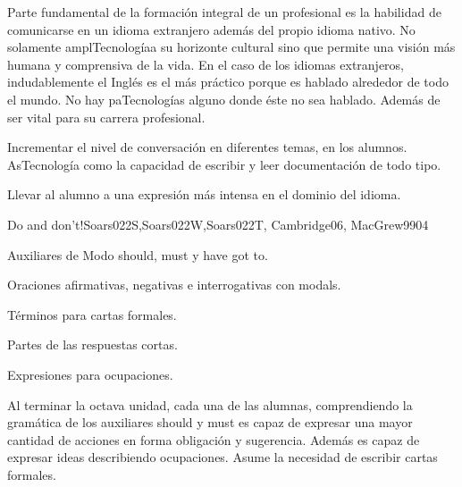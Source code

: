 \begin{syllabus}


\begin{justification}
Parte fundamental de la formación integral de un profesional es la habilidad 
de comunicarse en un idioma extranjero además del propio idioma nativo. 
No solamente amplTecnologíaa su horizonte cultural sino que permite una visión 
más humana y comprensiva de la vida. En el caso de los idiomas extranjeros, 
indudablemente el Inglés es el más práctico porque es hablado alrededor de 
todo el mundo. No hay paTecnologías alguno donde éste no sea hablado. Además de ser 
vital para su carrera profesional.
\end{justification}

\begin{goals}
\item Incrementar el nivel de conversación en diferentes temas, en los alumnos. AsTecnología como la capacidad de escribir y leer documentación de todo tipo.
\item Llevar al alumno a una expresión más intensa en el dominio del idioma.
\end{goals}

\begin{outcomes}
\end{outcomes}

\begin{unit}{Do and don't!}{Soars022S,Soars022W,Soars022T, Cambridge06, MacGrew99}{0}{4}
   \begin{topics}
      \item Auxiliares de Modo should, must y have got to.
      \item Oraciones afirmativas, negativas e interrogativas con modals.
      \item Términos para cartas formales.
      \item Partes de las respuestas cortas.
      \item Expresiones para ocupaciones.
   \end{topics}

   \begin{unitgoals}
      \item Al terminar la octava unidad, cada una de las alumnas, comprendiendo la gramática de los auxiliares should y must  es capaz de expresar una mayor cantidad de acciones en forma obligación y sugerencia.  Además es capaz de expresar ideas describiendo ocupaciones.  Asume la necesidad de escribir cartas formales. 
   \end{unitgoals}
\end{unit}


\end{syllabus}
